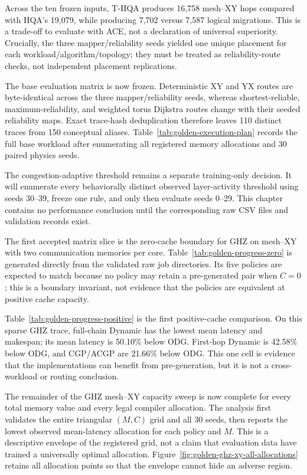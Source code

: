 

Across the ten frozen inputs, T-HQA produces 16,758 mesh--XY hops compared with
HQA's 19,079, while producing 7,702 versus 7,587 logical migrations. This is a
trade-off to evaluate with ACE, not a declaration of universal superiority.
Crucially, the three mapper/reliability seeds yielded one unique placement for each
workload/algorithm/topology; they must be treated as reliability-route checks, not
independent placement replications.

The base evaluation matrix is now frozen. Deterministic XY and YX routes are
byte-identical across the three mapper/reliability seeds, whereas shortest-reliable,
maximum-reliability, and weighted torus Dijkstra routes change with their seeded
reliability maps. Exact trace-hash deduplication therefore leaves 110 distinct traces
from 150 conceptual aliases. Table~\ref{tab:golden-execution-plan} records the full
base workload after enumerating all registered memory allocations and 30 paired
physics seeds.



The congestion-adaptive threshold remains a separate training-only decision. It
will enumerate every behaviorally distinct observed layer-activity threshold using
seeds 30--39, freeze one rule, and only then evaluate seeds 0--29. This chapter
contains no performance conclusion until the corresponding raw CSV files and
validation records exist.

The first accepted matrix slice is the zero-cache boundary for GHZ on mesh--XY
with two communication memories per core. Table~\ref{tab:golden-progress-zero} is
generated directly from the validated raw job directories. Its five policies are
expected to match because no policy may retain a pre-generated pair when $C=0$;
this is a boundary invariant, not evidence that the policies are equivalent at
positive cache capacity.



Table~\ref{tab:golden-progress-positive} is the first positive-cache comparison.
On this sparse GHZ trace, full-chain Dynamic has the lowest mean latency and
makespan; its mean latency is 50.10\% below ODG. First-hop Dynamic is 42.58\%
below ODG, and CGP/ACGP are 21.66\% below ODG. This one cell is evidence that the
implementations can benefit from pre-generation, but it is not a cross-workload
or routing conclusion.

The remainder of the GHZ mesh--XY capacity sweep is now complete for every total
memory value and every legal compiler allocation. The analysis first validates the
entire triangular $(M,C)$ grid and all 30 seeds, then reports the lowest observed
mean-latency allocation for each policy and $M$. This is a descriptive envelope of
the registered grid, not a claim that evaluation data have trained a universally
optimal allocation. Figure~\ref{fig:golden-ghz-xy-all-allocations} retains all
allocation points so that the envelope cannot hide an adverse region.

